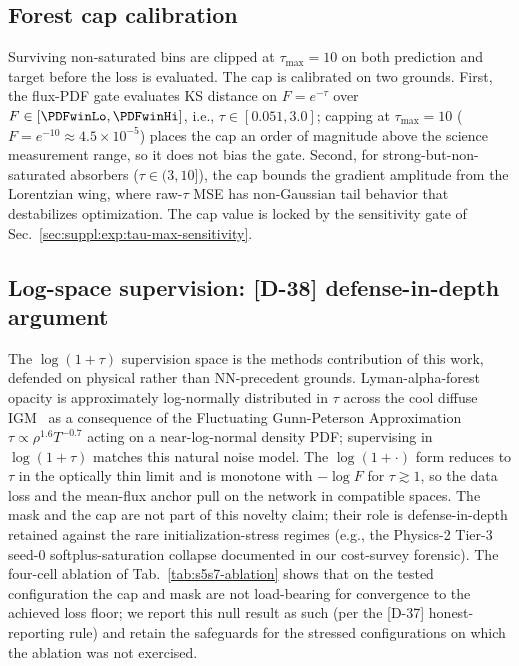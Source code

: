 \subsection{Forest cap calibration}
\label{sec:suppl:method:cap}
Surviving non-saturated bins are clipped at $\tau_{\max} = 10$ on both prediction and target before the loss is evaluated. The cap is calibrated on two grounds. First, the flux-PDF gate evaluates KS distance on $F = e^{-\tau}$ over $F \in [\PDFwinLo, \PDFwinHi]$, i.e., $\tau \in [0.051, 3.0]$; capping at $\tau_{\max} = 10$ ($F = e^{-10} \approx 4.5 \times 10^{-5}$) places the cap an order of magnitude above the science measurement range, so it does not bias the gate. Second, for strong-but-non-saturated absorbers ($\tau \in (3, 10]$), the cap bounds the gradient amplitude from the Lorentzian wing, where raw-$\tau$ MSE has non-Gaussian tail behavior that destabilizes optimization. The cap value is locked by the sensitivity gate of Sec.~\ref{sec:suppl:exp:tau-max-sensitivity}.

\subsection{Log-space supervision: [D-38] defense-in-depth argument}
\label{sec:suppl:method:logspace}
The $\log(1+\tau)$ supervision space is the methods contribution of this work, defended on physical rather than NN-precedent grounds. Lyman-alpha-forest opacity is approximately log-normally distributed in $\tau$ across the cool diffuse IGM~\cite{bi_davidsen1997, hui_gnedin1997} as a consequence of the Fluctuating Gunn-Peterson Approximation $\tau \propto \rho^{1.6} T^{-0.7}$ acting on a near-log-normal density PDF; supervising in $\log(1+\tau)$ matches this natural noise model. The $\log(1+\cdot)$ form reduces to $\tau$ in the optically thin limit and is monotone with $-\log F$ for $\tau \gtrsim 1$, so the data loss and the mean-flux anchor pull on the network in compatible spaces. The mask and the cap are not part of this novelty claim; their role is defense-in-depth retained against the rare initialization-stress regimes (e.g., the Physics-2 Tier-3 seed-0 softplus-saturation collapse documented in our cost-survey forensic). The four-cell ablation of Tab.~\ref{tab:s5s7-ablation} shows that on the tested configuration the cap and mask are not load-bearing for convergence to the achieved loss floor; we report this null result as such (per the [D-37] honest-reporting rule) and retain the safeguards for the stressed configurations on which the ablation was not exercised.

